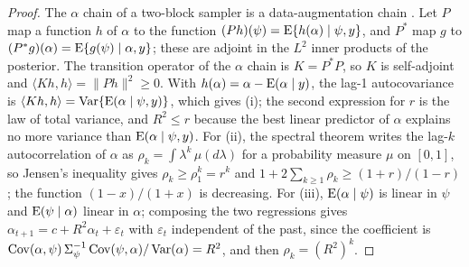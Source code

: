 \begin{proof}
The $\alpha$ chain of a two-block sampler is a data-augmentation chain
\citep{liu1994}. Let $P$ map a function $h$ of $\alpha$ to the function
$(Ph)(\psi) = \mathrm{E}\{h(\alpha) \mid \psi, y\}$, and $P^{*}$ map $g$ to
$(P^{*}g)(\alpha) = \mathrm{E}\{g(\psi) \mid \alpha, y\}$; these are adjoint in
the $L^2$ inner products of the posterior. The transition operator of the
$\alpha$ chain is $K = P^{*}P$, so $K$ is self-adjoint and $\langle Kh, h
\rangle = \|Ph\|^2 \geq 0$. With $h(\alpha) = \alpha - \mathrm{E}(\alpha \mid y)$,
the lag-1 autocovariance is $\langle Kh, h \rangle = \operatorname{Var}\{\mathrm{E}(\alpha \mid
\psi, y)\}$, which gives (i); the second
expression for $r$ is the law of total variance, and $R^2 \leq r$ because
the best linear predictor of $\alpha$ explains no more variance than
$\mathrm{E}(\alpha \mid \psi, y)$. For (ii), the spectral theorem writes the
lag-$k$ autocorrelation of $\alpha$ as $\rho_k = \int \lambda^k\,
\mu(d\lambda)$ for a probability measure $\mu$ on $[0, 1]$, so Jensen's
inequality gives $\rho_k \geq \rho_1^k = r^k$ and $1 + 2\sum_{k \geq 1}
\rho_k \geq (1 + r)/(1 - r)$; the function $(1 - x)/(1 + x)$ is
decreasing. For (iii), $\mathrm{E}(\alpha \mid \psi)$ is linear in $\psi$ and
$\mathrm{E}(\psi \mid \alpha)$ linear in $\alpha$; composing the two regressions
gives $\alpha_{t+1} = c + R^2 \alpha_t + \varepsilon_t$ with
$\varepsilon_t$ independent of the past, since the coefficient is
$\operatorname{Cov}(\alpha, \psi)\,\Sigma_\psi^{-1}
\operatorname{Cov}(\psi, \alpha) / \operatorname{Var}(\alpha) = R^2$, and then
$\rho_k = (R^2)^k$.
\end{proof}

